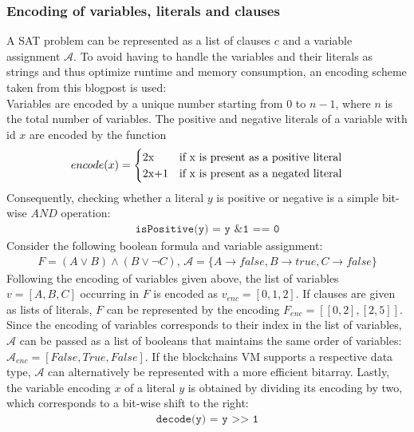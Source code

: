 \subsubsection{Encoding of variables, literals and clauses}
A SAT problem can be represented as a list of clauses $c$ and a variable assignment $\mathcal{A}$. To avoid having to handle the variables and their literals as strings and thus optimize runtime and memory consumption, an encoding scheme taken from this blogpost \cite{sabablog} is used: \\
Variables are encoded by a unique number starting from $0$ to $n-1$, where $n$ is the total number of variables. The positive and negative literals of a variable with id $x$ are encoded by the function
\begin{align*}
encode(x) =
\begin{cases}
  $2x$  & \text{if x is present as a positive literal}\\
  $2x+1$ & \text{if x is present as a negated literal}\\
\end{cases}   
\end{align*}
Consequently, checking whether a literal $y$ is positive or negative is a simple bit-wise $AND$ operation:
\begin{align*}
\texttt{isPositive(y) = y \& 1 == 0}
\end{align*}
Consider the following boolean formula and variable assignment:
\begin{align*}
F = (A \vee B) \wedge (B \vee \neg C) \text{, } \mathcal{A} = \{A \rightarrow false, B \rightarrow true, C \rightarrow false\}
\end{align*}
Following the encoding of variables given above, the list of variables $v=[A,B,C]$ occurring in $F$ is encoded as $v_{enc} = [0,1,2]$. If clauses are given as lists of literals, $F$ can be represented by the encoding $F_{enc} = [[0,2],[2,5]]$. Since the encoding of variables corresponds to their index in the list of variables, $\mathcal{A}$ can be passed as a list of booleans that maintains the same order of variables: $\mathcal{A}_{enc} = [False, True, False]$. If the blockchains VM supports a respective data type, $\mathcal{A}$ can alternatively be represented with a more efficient bitarray. Lastly, the variable encoding $x$ of a literal $y$ is obtained by dividing its encoding by two, which corresponds to a bit-wise shift to the right:
\begin{align*}
\texttt{decode(y) = y >> 1}
\end{align*}

